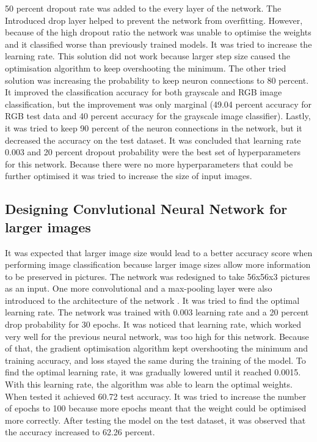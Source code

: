 50 percent dropout rate was added to the every layer of the network. The Introduced drop layer helped to prevent the network from overfitting. However, because of the high dropout ratio the network was unable to optimise the weights and it classified worse than previously trained models. It was tried to increase the learning rate. This solution did not work because larger step size caused the optimisation algorithm to keep overshooting the minimum. The other tried solution was increasing the probability to keep neuron connections to 80 percent. It improved the classification accuracy for both grayscale and RGB image classification, but the improvement was only marginal (49.04 percent accuracy for RGB test data and 40 percent accuracy for the grayscale image classifier). Lastly, it was tried to keep 90 percent of the neuron connections in the network, but it decreased the accuracy on the test dataset. It was concluded that learning rate 0.003 and 20 percent dropout probability were the best set of hyperparameters for this network. Because there were no more hyperparameters that could be further optimised it was tried to increase the size of input images.


\subsection{Designing Convlutional Neural Network  for larger images}

It was expected that larger image size would lead to a better accuracy score when performing image classification because larger image sizes allow more information to be preserved in pictures. The network was redesigned to take 56x56x3 pictures as an input. One more convolutional and a max-pooling layer were also introduced to the architecture of the network . It was tried to find the optimal learning rate. The network was trained with 0.003 learning rate and a 20 percent drop probability for 30 epochs. It was noticed that learning rate, which worked very well for the previous neural network, was too high for this network. Because of that, the gradient optimisation algorithm kept overshooting the minimum and training accuracy, and loss stayed the same during the training of the model. To find the optimal learning rate, it was gradually lowered until it reached 0.0015. With this learning rate, the algorithm was able to learn the optimal weights. When tested it achieved 60.72 test accuracy. It was tried to increase the number of epochs to 100 because more epochs meant that the weight could be optimised more correctly. After testing the model on the test dataset, it was observed that the accuracy increased to 62.26 percent.

